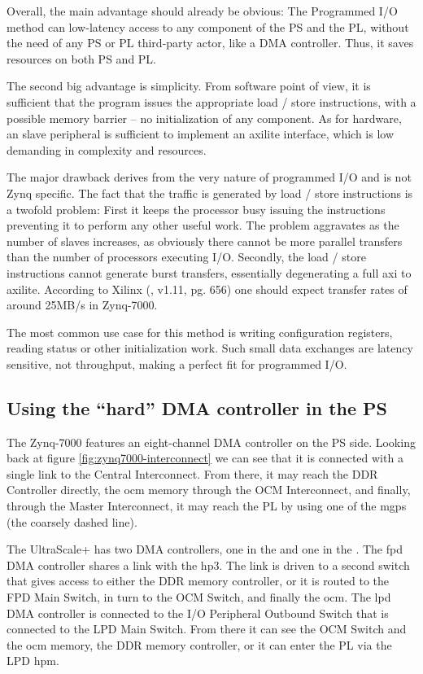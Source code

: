 Overall, the main advantage should already be obvious:
The Programmed I/O method can low-latency access to any component of the PS and the PL,
without the need of any PS or PL third-party actor, like a DMA controller. Thus, it saves
resources on both PS and PL.

The second big advantage is simplicity. From software point of view,
it is sufficient that the program issues the appropriate load / store instructions,
with a possible memory barrier -- no initialization of any component.
As for hardware, an slave peripheral is sufficient to
implement an \gls{axilite} interface, which is low demanding in complexity and resources.

The major drawback derives from the very nature of programmed I/O and is not Zynq specific.
The fact that the traffic is generated by load / store instructions is a twofold problem:
First it keeps the processor busy issuing the instructions preventing it
to perform any other useful work. The problem aggravates as the number of slaves increases,
as obviously there cannot be more parallel transfers than the number of processors executing I/O.
Secondly, the load / store instructions cannot generate \gls{burst} transfers,
essentially degenerating a full \gls{axi} to \gls{axilite}.
According to Xilinx (\cite{ug585}, v1.11, pg. 656) one should expect
transfer rates of around 25MB/s in Zynq-7000.

The most common use case for this method is writing configuration registers,
reading status or other initialization work.
Such small data exchanges are latency sensitive, not throughput,
making a perfect fit for programmed I/O.

\subsection{Using the ``hard'' DMA controller in the PS}

The Zynq-7000 features an eight-channel DMA controller on the PS side.
Looking back at figure \ref{fig:zynq7000-interconnect} we can see that it is connected
with a single link to the Central Interconnect.
From there, it may reach the DDR Controller directly, the \gls{ocm} memory through the
OCM Interconnect, and finally, through the Master Interconnect, it may reach the PL by
using one of the \glspl{mgp} (the coarsely dashed line).

The UltraScale+ has two DMA controllers, one in the  and one
in the .
The \gls{fpd} DMA controller shares a link with the \gls{hp}3. The link
is driven to a second switch that gives access to either the DDR memory controller,
or it is routed to the FPD Main Switch, in turn to the OCM Switch, and finally the \gls{ocm}.
The \gls{lpd} DMA controller is connected to the I/O Peripheral Outbound Switch that is
connected to the LPD Main Switch. From there it can see the OCM Switch and the \gls{ocm} memory,
the DDR memory controller, or it can enter the PL via the LPD \gls{hpm}.


